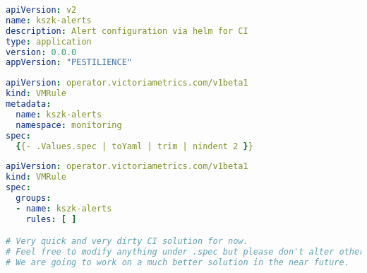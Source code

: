 \begin{lstlisting}[language=yaml,caption=./Chart.yaml]
apiVersion: v2
name: kszk-alerts
description: Alert configuration via helm for CI
type: application
version: 0.0.0
appVersion: "PESTILIENCE"
\end{lstlisting}

\begin{lstlisting}[language=yaml,caption=./templates/kszk-alerts.yaml]
apiVersion: operator.victoriametrics.com/v1beta1
kind: VMRule
metadata:
  name: kszk-alerts
  namespace: monitoring
spec:
  {{- .Values.spec | toYaml | trim | nindent 2 }}
\end{lstlisting}

\begin{lstlisting}[language=yaml,caption=./values.yaml]
apiVersion: operator.victoriametrics.com/v1beta1
kind: VMRule
spec:
  groups:
  - name: kszk-alerts
    rules: [ ]

# Very quick and very dirty CI solution for now.
# Feel free to modify anything under .spec but please don't alter others work wihout consultation.
# We are going to work on a much better solution in the near future.
\end{lstlisting}
